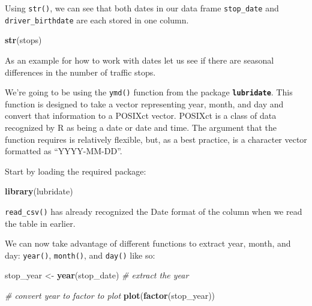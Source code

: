 \documentclass[
]{book}
\newenvironment{Shaded}{\begin{snugshade}}{\end{snugshade}}
\newcommand{\CommentTok}[1]{\textcolor[rgb]{0.56,0.35,0.01}{\textit{#1}}}
\newcommand{\FunctionTok}[1]{\textcolor[rgb]{0.13,0.29,0.53}{\textbf{#1}}}
\newcommand{\NormalTok}[1]{#1}
\newcommand{\OtherTok}[1]{\textcolor[rgb]{0.56,0.35,0.01}{#1}}
\newcommand{\SpecialCharTok}[1]{\textcolor[rgb]{0.81,0.36,0.00}{\textbf{#1}}}
\begin{document}
Using \texttt{str()}, we can see that both dates in our data frame \texttt{stop\_date} and \texttt{driver\_birthdate} are each stored in one column.

\begin{Shaded}
\begin{Highlighting}[]
\FunctionTok{str}\NormalTok{(stops)}
\end{Highlighting}
\end{Shaded}

As an example for how to work with dates let us see if there are seasonal differences in the number of traffic stops.

We're going to be using the \texttt{ymd()} function from the package \textbf{\texttt{lubridate}}. This
function is designed to take a vector representing year, month, and day and convert
that information to a POSIXct vector. POSIXct is a class of data recognized by R as
being a date or date and time. The argument that the function requires is relatively
flexible, but, as a best practice, is a character vector formatted as ``YYYY-MM-DD''.

Start by loading the required package:

\begin{Shaded}
\begin{Highlighting}[]
\FunctionTok{library}\NormalTok{(lubridate)}
\end{Highlighting}
\end{Shaded}

\texttt{read\_csv()} has already recognized the Date format of the column when we read the table in earlier.

\begin{Shaded}
\end{Shaded}

We can now take advantage of different functions to extract year, month, and day: \texttt{year()}, \texttt{month()}, and \texttt{day()} like so:

\begin{Shaded}
\begin{Highlighting}[]
\NormalTok{stop\_year }\OtherTok{\textless{}{-}} \FunctionTok{year}\NormalTok{(stop\_date) }\CommentTok{\# extract the year}

\CommentTok{\# convert year to factor to plot}
\FunctionTok{plot}\NormalTok{(}\FunctionTok{factor}\NormalTok{(stop\_year)) }
\end{Highlighting}
\end{Shaded}
\end{document}
